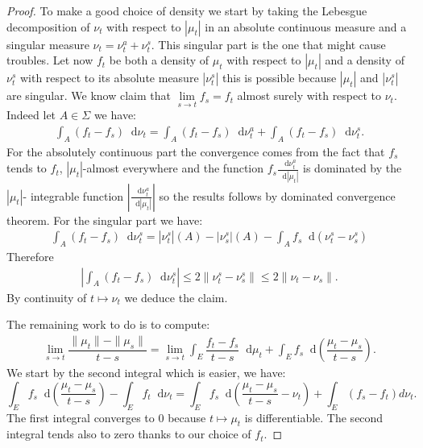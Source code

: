 \documentclass[11pt,a4paper]{article}
\newcommand{\dd}{\mathop{}\!\mathrm{d}}
\begin{document}
\begin{proof}
    To make a good choice of density we start by taking the Lebesgue decomposition of $\nu_t$ with respect to $|\mu_t|$ in an absolute continuous measure and a singular measure $\nu_t = \nu_t^a + \nu_t^s$. This singular part is the one that might cause troubles. Let now $f_t$ be both a density of $\mu_t$ with respect to $|\mu_t|$ and a density of  $\nu_t^s$ with respect to its absolute measure $|\nu^s_t|$ this is possible because $|\mu_t|$ and $|\nu^s_t|$ are singular. We know claim that $\lim\limits_{s \to t}f_s = f_t$ almost surely with respect to $\nu_t$. Indeed let $A \in \Sigma$ we have:
    \begin{align*}
        \int_A (f_t - f_s) \dd \nu_t = \int_A (f_t - f_s) \dd \nu^a_t + \int_A (f_t - f_s) \dd \nu^s_t.
    \end{align*}
    For the absolutely continuous part the convergence comes from the fact that $f_s$ tends to $f_t$, $|\mu_t|$-almost everywhere and the function $f_s \frac{\dd \nu^a_t}{\dd |\mu_t|}$ is dominated by the $|\mu_t|$- integrable function $\left\lvert\frac{\dd \nu^a_t}{\dd |\mu_t|}\right\rvert$ so the results follows by dominated convergence theorem. For the singular part we have:
    \begin{align*}
        \int_A (f_t - f_s) \dd \nu^s_t = |\nu^s_t|(A) - |\nu^s_s|(A) - \int_A f_s\dd\left( \nu^s_t - \nu^s_s\right)
    \end{align*}
    Therefore 
    \begin{align*}
        \left\lvert \int_A (f_t - f_s) \dd \nu^s_t \right\rvert \leq 2\| \nu^s_t - \nu^s_s\| \leq 2\| \nu_t - \nu_s\|.
    \end{align*}
    By continuity of $t \mapsto \nu_t$ we deduce the claim.
    
    The remaining work to do is to compute:
    \begin{align*}
       \lim\limits_{s\to t}\dfrac{\| \mu_t\| -\|\mu_s\|}{t-s} = \lim\limits_{s\to t}\int_E \dfrac{f_{t}-f_s}{t-s}\dd\mu_{t }  + \int_E f_s\dd\left(\dfrac{\mu_{t } - \mu_s}{t-s}\right).
    \end{align*}
    We start by the second integral which is easier, we have:
    \[
        \int_E f_s\dd\left(\dfrac{\mu_{t } - \mu_s}{t-s}\right) - \int_E f_t \dd \nu_t
        =\int_E f_s \dd\left(\dfrac{\mu_{t } - \mu_s}{t-s} - \nu_t\right) + \int_E (f_s - f_t)d\nu_t.
    \]
    The first integral converges to $0$ because $t\mapsto \mu_t$ is differentiable. The second integral tends also to zero thanks to our choice of $f_t$.


\end{proof}
\end{document}
